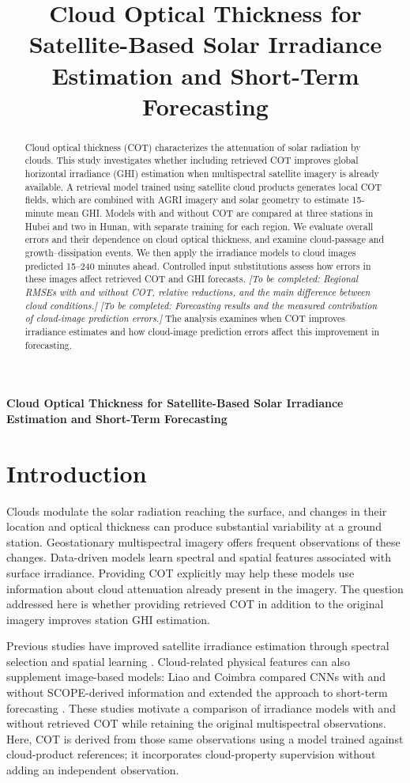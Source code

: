\documentclass[11pt]{article}
\title{Cloud Optical Thickness for Satellite-Based Solar Irradiance Estimation and Short-Term Forecasting}
\author{}\date{}
\newcommand{\pending}[1]{\textit{[To be completed: #1]}}
\begin{document}
\begin{center}\LARGE\bfseries
Cloud Optical Thickness for Satellite-Based Solar Irradiance Estimation and Short-Term Forecasting
\end{center}
\begin{abstract}
Cloud optical thickness (COT) characterizes the attenuation of solar radiation by clouds. This study investigates whether including retrieved COT improves global horizontal irradiance (GHI) estimation when multispectral satellite imagery is already available. A retrieval model trained using satellite cloud products generates local COT fields, which are combined with AGRI imagery and solar geometry to estimate 15-minute mean GHI. Models with and without COT are compared at three stations in Hubei and two in Hunan, with separate training for each region. We evaluate overall errors and their dependence on cloud optical thickness, and examine cloud-passage and growth--dissipation events. We then apply the irradiance models to cloud images predicted 15--240 minutes ahead. Controlled input substitutions assess how errors in these images affect retrieved COT and GHI forecasts. \pending{Regional RMSEs with and without COT, relative reductions, and the main difference between cloud conditions.} \pending{Forecasting results and the measured contribution of cloud-image prediction errors.} The analysis examines when COT improves irradiance estimates and how cloud-image prediction errors affect this improvement in forecasting.
\end{abstract}

\section{Introduction}
Clouds modulate the solar radiation reaching the surface, and changes in their location and optical thickness can produce substantial variability at a ground station. Geostationary multispectral imagery offers frequent observations of these changes. Data-driven models learn spectral and spatial features associated with surface irradiance. Providing COT explicitly may help these models use information about cloud attenuation already present in the imagery. The question addressed here is whether providing retrieved COT in addition to the original imagery improves station GHI estimation.

Previous studies have improved satellite irradiance estimation through spectral selection and spatial learning \cite{chen2023}. Cloud-related physical features can also supplement image-based models: Liao and Coimbra compared CNNs with and without SCOPE-derived information and extended the approach to short-term forecasting \cite{liao2024}. These studies motivate a comparison of irradiance models with and without retrieved COT while retaining the original multispectral observations. Here, COT is derived from those same observations using a model trained against cloud-product references; it incorporates cloud-property supervision without adding an independent observation.
\end{document}
